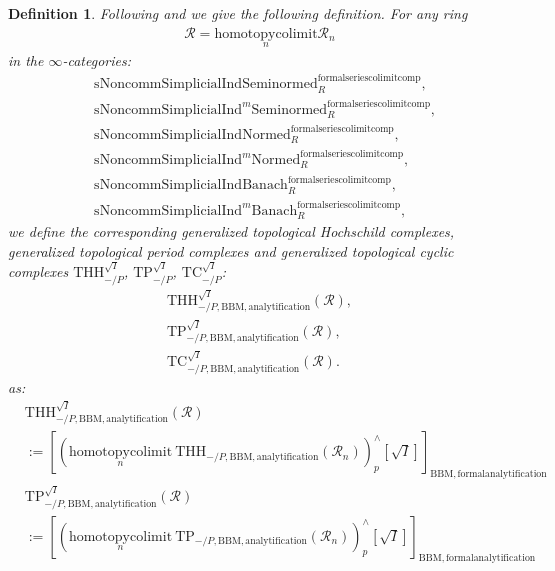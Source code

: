 \documentclass[12pt]{book}
\newtheorem{definition}{Definition}
\begin{document}
\begin{definition}
Following \cite[Section 2.3]{BMS} and \cite[Chapter 3]{NS} we give the following definition. For any ring
\begin{align}
\mathcal{R}=\underset{n}{\mathrm{homotopycolimit}}\mathcal{R}_n	
\end{align}
in the $\infty$-categories:
\begin{align}
&\mathrm{sNoncomm}\mathrm{Simplicial}\mathrm{Ind}\mathrm{Seminormed}^\mathrm{formalseriescolimitcomp}_R,\\
&\mathrm{sNoncomm}\mathrm{Simplicial}\mathrm{Ind}^m\mathrm{Seminormed}^\mathrm{formalseriescolimitcomp}_R,\\
&\mathrm{sNoncomm}\mathrm{Simplicial}\mathrm{Ind}\mathrm{Normed}^\mathrm{formalseriescolimitcomp}_R,\\
&\mathrm{sNoncomm}\mathrm{Simplicial}\mathrm{Ind}^m\mathrm{Normed}^\mathrm{formalseriescolimitcomp}_R,\\
&\mathrm{sNoncomm}\mathrm{Simplicial}\mathrm{Ind}\mathrm{Banach}^\mathrm{formalseriescolimitcomp}_R,\\
&\mathrm{sNoncomm}\mathrm{Simplicial}\mathrm{Ind}^m\mathrm{Banach}^\mathrm{formalseriescolimitcomp}_R,	
\end{align}	
we define the corresponding generalized topological Hochschild complexes, generalized topological period complexes and generalized topological cyclic complexes $\mathrm{THH}^{\sqrt{I}}_{-/P}$, $\mathrm{TP}^{\sqrt{I}}_{-/P}$, $\mathrm{TC}^{\sqrt{I}}_{-/P}$:
\begin{align}
 \mathrm{THH}^{\sqrt{I}}_{-/P,\mathrm{BBM},\mathrm{analytification}}(\mathcal{R}),\\
 \mathrm{TP}^{\sqrt{I}}_{-/P,\mathrm{BBM},\mathrm{analytification}}(\mathcal{R}),\\
 \mathrm{TC}^{\sqrt{I}}_{-/P,\mathrm{BBM},\mathrm{analytification}}(\mathcal{R}). 
\end{align}
as:
\begin{align}
& \mathrm{THH}^{\sqrt{I}}_{-/P,\mathrm{BBM},\mathrm{analytification}}(\mathcal{R})\\
&:=[(\underset{n}{\mathrm{homotopycolimit}}~  \mathrm{THH}_{-/P,\mathrm{BBM},\mathrm{analytification}}(\mathcal{R}_n))^\wedge_{p}[\sqrt{I}]]_{\mathrm{BBM},\mathrm{formalanalytification}}\\
& \mathrm{TP}^{\sqrt{I}}_{-/P,\mathrm{BBM},\mathrm{analytification}}(\mathcal{R})\\
&:=[(\underset{n}{\mathrm{homotopycolimit}}~  \mathrm{TP}_{-/P,\mathrm{BBM},\mathrm{analytification}}(\mathcal{R}_n))^\wedge_{p}[\sqrt{I}]]_{\mathrm{BBM},\mathrm{formalanalytification}}\\

\end{align}
\end{definition}
\end{document}
